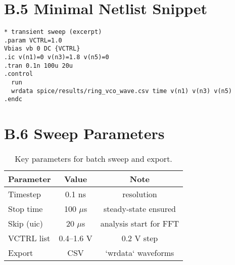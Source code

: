 \section*{B.5 Minimal Netlist Snippet}
\begin{lstlisting}
* transient sweep (excerpt)
.param VCTRL=1.0
Vbias vb 0 DC {VCTRL}
.ic v(n1)=0 v(n3)=1.8 v(n5)=0
.tran 0.1n 100u 20u
.control
  run
  wrdata spice/results/ring_vco_wave.csv time v(n1) v(n3) v(n5)
.endc
\end{lstlisting}

\section*{B.6 Sweep Parameters}
\begin{table}[H]
  \centering
  \begin{tabular}{lcc}
    \toprule
    Parameter & Value & Note \\
    \midrule
    Timestep & 0.1 ns & resolution \\
    Stop time & 100 \(\mu\)s & steady-state ensured \\
    Skip (uic) & 20 \(\mu\)s & analysis start for FFT \\
    VCTRL list & 0.4--1.6 V & 0.2 V step \\
    Export & CSV & `wrdata` waveforms \\
    \bottomrule
  \end{tabular}
  \caption{Key parameters for batch sweep and export.}
\end{table}


